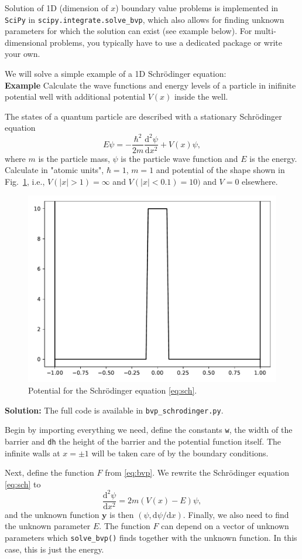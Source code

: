\documentclass{article}
\newcommand{\dd}{\ensuremath{\mathrm{d}}}
\newcommand{\bv}[1]{\ensuremath{\mathbf{#1}}}
\newcommand{\ls}[1]{\lstinline{#1}}
\begin{document}
Solution of 1D (dimension of $x$) boundary value problems is implemented in \verb|SciPy| in \ls{scipy.integrate.solve_bvp}, which also allows for finding unknown parameters for which the solution can exist (see example below). For multi-dimensional problems, you typically have to use a dedicated package or write your own.

We will solve a simple example of a 1D Schr\"{o}dinger equation:\\
\textbf{Example} Calculate the wave functions and energy levels of a particle in inifinite potential well with additional potential $V(x)$ inside the well.

The states of a quantum particle are described with a stationary Schr\"{o}dinger equation
\begin{equation}
    \label{eq:sch}
    E\psi = -\frac{\hbar^2}{2m}\frac{\dd^2\psi}{\dd x^2} + V(x)\psi,
\end{equation}
where $m$ is the particle mass, $\psi$ is the particle wave function and $E$ is the energy. Calculate in "atomic units", $\hbar = 1$, $m=1$ and potential of the shape shown in Fig.~\ref{fig:potential}, i.e., $V(|x| > 1) = \infty$ and $V(|x| < 0.1) = 10)$ and $V=0$ elsewhere.
\begin{figure}[h!]
    \centering
    \label{fig:potential}
    \includegraphics[width=0.5\linewidth]{sch_potential.pdf}
    \caption{Potential for the Schrödinger equation \eqref{eq:sch}.}
\end{figure}

\textbf{Solution:} The full code is available in \ls{bvp_schrodinger.py}. 

Begin by importing everything we need, define the constants \ls{w}, the width of the barrier and \ls{dh} the height of the barrier and the potential function itself. The infinite walls at $x=\pm 1$ will be taken care of by the boundary conditions.


Next, define the function $F$ from \eqref{eq:bvp}. We rewrite the Schrödinger equation \eqref{eq:sch} to
\begin{equation}
    \frac{\dd^2\psi}{\dd x^2} = 2m(V(x) - E)\psi,
\end{equation}
and the unknown function $\bv y$ is then $(\psi, \dd \psi/\dd x)$. Finally, we also need to find the unknown parameter $E$. The function $F$ can depend on a vector of unknown parameters which \ls{solve_bvp()} finds together with the unknown function. In this case, this is just the energy.

\end{document}
